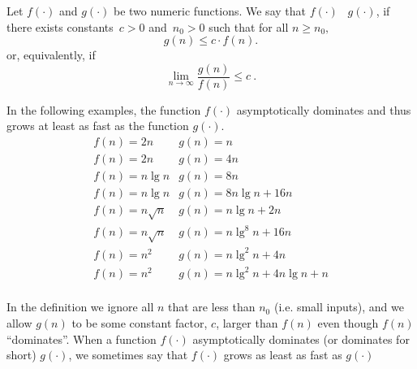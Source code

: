 \begin{flex}
\label{grp:def:analysis::asymptotics::asymptotic-dominance}

\begin{definition}
\label{def:analysis::asymptotics::asymptotic-dominance}
    Let $f(\cdot)$ and $g(\cdot)$ be two numeric functions.  We say that
    $f(\cdot)$~ $g(\cdot)$,  if there
    exists constants~$c > 0$ and~$n_0 > 0$ such that for all 
    $n \ge n_0,$
    \[
      g(n) \le c \cdot f(n).
    \]
    or, equivalently, if
    \[\lim_{n \rightarrow \infty} \frac{g(n)}{f(n)} \leq c~.\]
  

\end{definition}

\begin{example}
\label{xmpl:analysis::asymptotics::function}
    In the following examples, the function $f(\cdot)$ asymptotically 
    dominates and thus grows at least as fast as the function $g(\cdot)$. 
        \[
      \begin{array}{ll}
        f(n) = 2n & g(n) = n \\
        f(n) = 2n & g(n) = 4n \\
        f(n) = n\lg{n} & g(n) = 8n \\
        f(n) = n\lg{n} & g(n) = 8n\lg{n} + 16n \\
        f(n) = n\sqrt{n} & g(n) = n\lg{n} + 2n \\
        f(n) = n\sqrt{n} & g(n) = n\lg^8{n} + 16n \\
        f(n) = n^2 & g(n) = n\lg^2{n} + 4n \\
        f(n) = n^2 & g(n) = n\lg^2{n} + 4n\lg{n} + n \\
      \end{array}
    \]
  

\end{example}
\end{flex}

\begin{cluster}
\label{grp:grm:analysis::asymptotics::ignore}

\begin{gram}
\label{grm:analysis::asymptotics::ignore}
In the definition we ignore all $n$ that are less than 
$n_0$ (i.e. small inputs), and we allow $g(n)$ to be some constant factor, $c$, larger
than $f(n)$ even though $f(n)$ ``dominates''.
When a function $f(\cdot)$ asymptotically dominates (or dominates for short)
$g(\cdot)$,  we sometimes say that $f(\cdot)$ grows as least as fast as
$g(\cdot)$

\end{gram}
\end{cluster}

